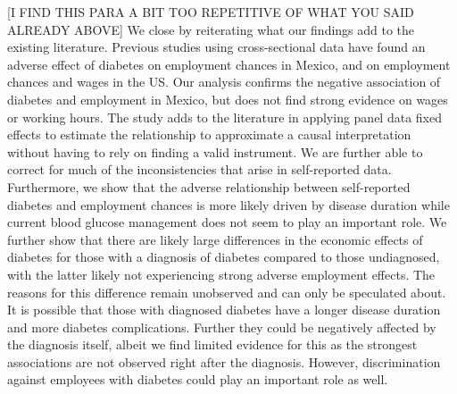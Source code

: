 [I FIND THIS PARA A BIT TOO REPETITIVE OF WHAT YOU SAID ALREADY ABOVE] We close by reiterating what our findings add to the existing literature.
Previous studies using cross-sectional data have found an adverse
effect of diabetes on employment chances in Mexico, and on employment
chances and wages in the US. Our analysis confirms the negative association
of diabetes and employment in Mexico, but does not find strong evidence
on wages or working hours. The study adds to the literature in applying
panel data fixed effects to estimate the relationship to approximate
a causal interpretation without having to rely on finding a valid
instrument. We are further able to correct for much of the inconsistencies
that arise in self-reported data. Furthermore, we show that the adverse
relationship between self-reported diabetes and employment chances
is more likely driven by disease duration while current blood glucose
management does not seem to play an important role. We further show
that there are likely large differences in the economic effects of
diabetes for those with a diagnosis of diabetes compared to those
undiagnosed, with the latter likely not experiencing strong adverse
employment effects. The reasons for this difference remain unobserved
and can only be speculated about. It is possible that those with diagnosed
diabetes have a longer disease duration and more diabetes complications.
Further they could be negatively affected by the diagnosis itself,
albeit we find limited evidence for this as the strongest associations
are not observed right after the diagnosis. However, discrimination
against employees with diabetes could play an important role as well.
  
  